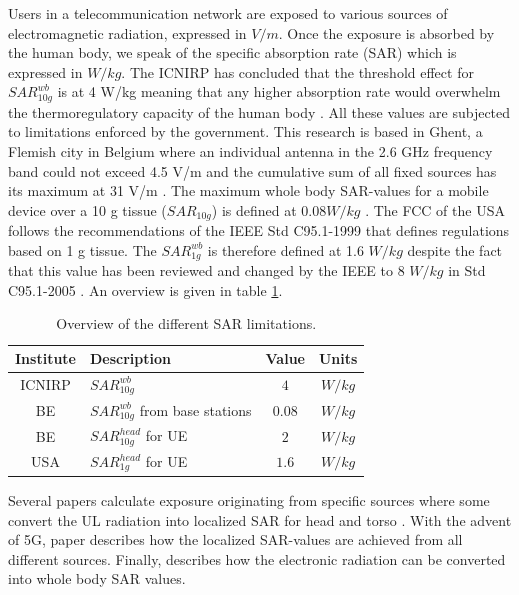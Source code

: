 \documentclass[twocolumn]{phdsymp} %
\begin{document}
Users in a telecommunication network are exposed to various sources of electromagnetic radiation, expressed in $V/m$. Once the exposure is absorbed by the human 
body, we speak of the specific absorption rate (SAR) which is expressed in $W/kg$. 
The \gls{ICNIRP} has concluded that the threshold effect for $SAR^{wb}_{10g}$ is at 4 W/kg meaning that any higher absorption 
rate would overwhelm the \gls{thermoregulatory capacity} of the human body  \cite{J23,J24}.
All these values are 
subjected to limitations enforced by the government. This research is based in Ghent, 
a Flemish city in Belgium where an individual antenna in the 2.6 GHz frequency band could not exceed 4.5 V/m and the cumulative sum of all 
fixed sources has its maximum at 31 V/m \cite{J23,S13_normenBelgie}. The maximum whole body SAR-values for a mobile device 
over a 10 g tissue ($SAR_{10g}$) is defined at $0.08 W/kg$ \cite{J30,J23,S20}. 
The \gls{FCC} of the \gls{USA} follows the recommendations of the \gls{IEEE} Std C95.1-1999 \cite{P1,P2} that defines 
regulations based on 1 g tissue.
The $SAR^{wb}_{1g}$ is therefore defined at 1.6 $W/kg$ despite the fact that this value has been reviewed and changed by the \gls{IEEE} to 8 $W/kg$ in Std C95.1-2005 \cite{P2}.
An overview is given in table \ref{table:overviewSARValues}.
\begin{table}[h!]
\centering
\begin{tabular}{|c|l|c|c|}
\hline
\textbf{Institute}  & \textbf{Description}                  & \textbf{Value}  & \textbf{Units} \\ \hline
\gls{ICNIRP}          & $SAR^{wb}_{10g}$                      &  $4$            & $W/kg$              \\ \hline
BE                    & $SAR^{wb}_{10g}$ from base stations     & $0.08$          & $W/kg$               \\ \hline
BE                    & $SAR_{10g}^{head}$ for \acs{UE}       & $2$             & $W/kg$               \\ \hline
\gls{USA}             & $SAR_{1g}^{head}$ for \acs{UE}        & $1.6$           & $W/kg$               \\ \hline
\end{tabular}
\caption{Overview of the different \acs{SAR} limitations.}
\label{table:overviewSARValues}
\end{table}

Several papers calculate exposure originating from specific sources  \cite{J6_originalExposureFormula,J1,J10_RDP,J10.1} 
where some convert the \gls{UL} radiation into localized \gls{SAR} for head and torso \cite{J10_RDP,J10.1}. 
With the advent of 5G, paper \cite{J17_kuehn2019modelling} describes 
how the localized \gls{SAR}-values are achieved from all different sources.
Finally, \cite{J22_plets2015joint} describes how the electronic radiation can be converted into whole body SAR values.
\end{document}
